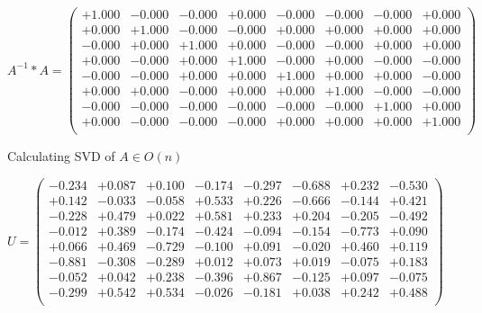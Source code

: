 \documentclass[9pt]{article}
\theoremstyle{plain}
\theoremstyle{definition}
\theoremstyle{remark}
\numberwithin{equation}{section}
\begin{document}
$A^{-1} *A = \left(
\begin{array}{
cccccccc}
+1.000 & -0.000 & -0.000 & +0.000 & -0.000 & -0.000 & -0.000 & +0.000 \\
+0.000 & +1.000 & -0.000 & -0.000 & +0.000 & +0.000 & +0.000 & +0.000 \\
-0.000 & +0.000 & +1.000 & +0.000 & -0.000 & -0.000 & +0.000 & +0.000 \\
+0.000 & -0.000 & +0.000 & +1.000 & -0.000 & +0.000 & -0.000 & -0.000 \\
-0.000 & -0.000 & +0.000 & +0.000 & +1.000 & +0.000 & +0.000 & -0.000 \\
+0.000 & +0.000 & -0.000 & +0.000 & +0.000 & +1.000 & -0.000 & -0.000 \\
-0.000 & -0.000 & -0.000 & -0.000 & -0.000 & -0.000 & +1.000 & +0.000 \\
+0.000 & -0.000 & -0.000 & -0.000 & +0.000 & +0.000 & +0.000 & +1.000 \\
\end{array}
\right)$ \newline 

Calculating SVD of  $A \in O(n)$

$U = \left(
\begin{array}{
cccccccc}
-0.234 & +0.087 & +0.100 & -0.174 & -0.297 & -0.688 & +0.232 & -0.530 \\
+0.142 & -0.033 & -0.058 & +0.533 & +0.226 & -0.666 & -0.144 & +0.421 \\
-0.228 & +0.479 & +0.022 & +0.581 & +0.233 & +0.204 & -0.205 & -0.492 \\
-0.012 & +0.389 & -0.174 & -0.424 & -0.094 & -0.154 & -0.773 & +0.090 \\
+0.066 & +0.469 & -0.729 & -0.100 & +0.091 & -0.020 & +0.460 & +0.119 \\
-0.881 & -0.308 & -0.289 & +0.012 & +0.073 & +0.019 & -0.075 & +0.183 \\
-0.052 & +0.042 & +0.238 & -0.396 & +0.867 & -0.125 & +0.097 & -0.075 \\
-0.299 & +0.542 & +0.534 & -0.026 & -0.181 & +0.038 & +0.242 & +0.488 \\
\end{array}
\right)$ \newline 
\end{document}
